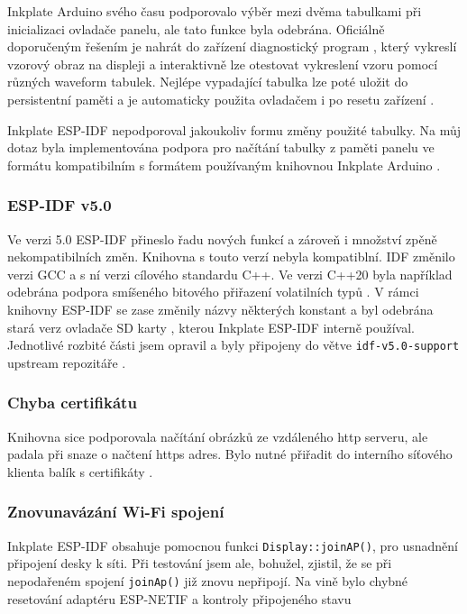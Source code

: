 Inkplate Arduino svého času podporovalo výběr mezi dvěma tabulkami při inicializaci ovladače panelu, ale tato funkce byla odebrána. Oficiálně doporučeným řešením je nahrát do zařízení diagnostický program \cite{InkplateArduinolibraryExamplesInkplate10}, který vykreslí vzorový obraz na displeji a interaktivně lze otestovat vykreslení vzoru pomocí různých waveform tabulek. Nejlépe vypadající tabulka lze poté uložit do persistentní paměti a je automaticky použita ovladačem i po resetu zařízení \cite{Inkplate10Washed}.

Inkplate ESP-IDF nepodporoval jakoukoliv formu změny použité tabulky. Na můj dotaz byla implementována podpora pro načítání tabulky z paměti panelu ve formátu kompatibilním s formátem používaným knihovnou Inkplate Arduino \cite{FeatureAddLightWaveform}.

\subsubsection{ESP-IDF v5.0} Ve verzi 5.0 ESP-IDF přineslo řadu nových funkcí a zároveň i množství zpěně nekompatibilních změn. Knihovna s touto verzí nebyla kompatiblní. IDF změnilo verzi GCC a s ní verzi cílového standardu C++. Ve verzi C++20 byla například odebrána podpora smíšeného bitového přiřazení volatilních typů \cite{jtcDedeprecatingVolatileCompound}. V rámci knihovny ESP-IDF se zase změnily názvy některých konstant\cite{PeripheralsESP32S2ESPIDF} a byl odebrána stará verz ovladače SD karty \cite{StorageESP32S2ESPIDF}, kterou Inkplate ESP-IDF interně používal. Jednotlivé rozbité části jsem opravil a byly připojeny do větve \lstinline|idf-v5.0-support| upstream repozitáře \cite{WIPInitialSupport}. 

\subsubsection{Chyba certifikátu} Knihovna sice podporovala načítání obrázků ze vzdáleného http serveru, ale padala při snaze o načtení https adres. Bylo nutné přiřadit do interního síťového klienta balík s certifikáty \cite{MenuconfigVariantSelection}.

\subsubsection{Znovunavázání Wi-Fi spojení} Inkplate ESP-IDF obsahuje pomocnou funkci \lstinline|Display::joinAP()|, pro usnadnění připojení desky k síti. Při testování jsem ale, bohužel, zjistil, že se při nepodařeném spojení \lstinline|joinAp()| již znovu nepřipojí. Na vině bylo chybné resetování adaptéru ESP-NETIF a kontroly připojeného stavu \cite{MenuconfigVariantSelection}


